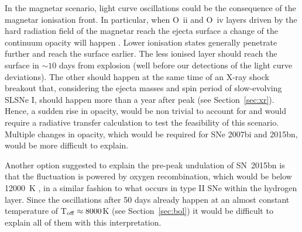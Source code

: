 \documentclass[useAMS,usenatbib]{mn2e}
\begin{document}
In the magnetar scenario, light curve oscillations could be the consequence of the magnetar ionisation front. In particular, when O~{\sc ii} and O~{\sc iv} layers driven by the hard radiation field of the magnetar reach the ejecta surface a change of the continuum opacity will happen \citep{me14}. Lower ionisation states generally penetrate further and reach the surface earlier. The less ionised layer should reach the surface in $\sim10$ days from explosion (well before our detections of the 
light curve deviations). The other should happen at the same time of an X-ray shock breakout that, considering the ejecta masses and spin period of slow-evolving SLSNe I, should happen more than a year after peak (see Section~\ref{sec:xr}).
Hence, a sudden rise in opacity,
would be non trivial to account for and would require a radiative transfer calculation to test the feasibility of this scenario. 
Multiple changes in opacity, which would be required for SNe 2007bi and 2015bn, would be more difficult to explain. 

Another option suggested to explain the pre-peak undulation of SN~2015bn \citep{ni16a} is that the fluctuation is powered by oxygen recombination, which would be below 12000~K \citep{hat99,qu13,in13}, in a similar fashion to what occurs in type II SNe within the hydrogen layer. Since the oscillations after 50 days already happen at an almost constant temperature of T$_{\rm off}\approx8000$K (see Section~\ref{sec:bol}) it would be difficult to explain all of them with this interpretation.
\end{document}
